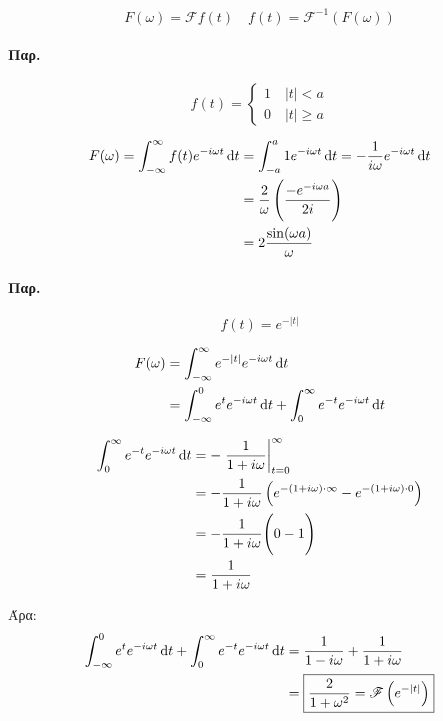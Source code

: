\documentclass[11pt,a4paper,titlepage,final]{article}
\begin{document}
\begin{tcolorbox}
\[
F(\omega) = \mathscr{F} f(t)
\quad
f(t) = \mathscr{F}^{-1} \left( F(\omega) \right)
\]
\end{tcolorbox}

\paragraph{Παρ.}
\[
f(t)=
\begin{cases}
1 \quad |t|<a\\
0 \quad |t|\geq a
\end{cases}
\]

\begin{align*}
F(\omega) = \int_{-\infty}^\infty f(t)e^{-i\omega t} \dif t
&= \int_{-a}^a 1 e^{-i \omega t} \dif t = -\frac{1}{i \omega } e^{-i \omega t} \dif t
\\
&=
\frac{2}{\omega}
\left(
\frac{-e^{-i \omega a}}{2i}
\right)
\\ &= 2 \frac{\sin( \omega a)}{\omega}
\end{align*}

\paragraph{Παρ.}
\[
f(t)=e^{-|t|}
\]

\begin{align*}
F( \omega )&=\int_{- \infty }^ \infty e^{-|t|} e^{-i \omega t} \dif t
\\ &=
\int_{- \infty }^0 e^t e^{-i \omega t} \dif t
+ \int_0^ \infty e^{-t}e^{-i \omega t} \dif t
\end{align*}

\begin{align*}
\int_0^ \infty e^{-t}e^{-i \omega t} \dif t &=
-\left. \frac{1}{1+i\omega} \right|_{t=0}^\infty
\\
&= -\frac{1}{1+i\omega} \left(
e^{-(1+i \omega )\cdot\infty}-e^{-(1+i \omega )\cdot0}
\right)
\\ &=
-\frac{1}{1+i\omega}
\Bigg(
0-1
\Bigg)
\\ &= \frac{1}{1+i\omega}
\end{align*}


Άρα:
\begin{align*}
\int_{- \infty }^0 e^t e^{-i \omega t} \dif t
+ \int_0^ \infty e^{-t}e^{-i \omega t} \dif t
&= \frac{1}{1-i \omega }+\frac{1}{1+i \omega }\\
&=
\boxed{
\frac{2}{1+\omega^2} = \mathscr{F} \left(
e^{-|t|}
\right)
}
\end{align*}
\end{document}
